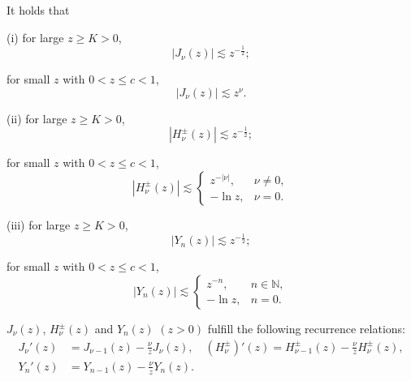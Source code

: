 \documentclass[10pt,a4paper]{amsart}
\newcommand{\N}{\mathbb N}
\newcommand{\f}{\frac}
\begin{document}
\begin{lemma}\label{lem1}
It holds that

(i) for large $z\geq K > 0$,
\begin{equation}\label{equ:q14}
|J_{\nu}(z)|\lesssim z^{-\f{1}{2}};
\end{equation}

\quad for small $z$ with $0<z\leq c<1$,
\begin{equation}\label{equ:q15}
|J_{\nu}(z)|\lesssim z^{\nu}.
\end{equation}

(ii) for large $z\geq K > 0$,
\begin{equation}\label{equ:q12}
|H_{\nu}^{\pm}(z)|\lesssim z^{-\f{1}{2}};
\end{equation}

\quad for small $z$ with $0<z\leq c<1$,
\begin{equation}\label{equ:q13}
\left|H_{\nu}^{ \pm}(z)\right| \lesssim \begin{cases}z^{-|\nu|}, & \nu \neq 0, \\
-\ln z, & \nu=0.
\end{cases}
\end{equation}

(iii) for large $z\geq K > 0$,
\begin{equation}\label{equ:q14-1}
|Y_{n}(z)|\lesssim z^{-\f{1}{2}};
\end{equation}

\quad for small $z$ with $0<z\leq c<1$,
\begin{equation}\label{equ:q15-1}
|Y_{n}(z)| \lesssim \begin{cases}z^{-n}, & n \in \N, \\
-\ln z, & n=0.
\end{cases}
\end{equation}
\end{lemma}

\begin{lemma}\label{lem1-1}
$J_{\nu}(z)$, $H_{\nu}^{\pm}(z)$ and $Y_{n}(z)$ $(z>0)$ fulfill the following recurrence relations:
\begin{equation}\label{equ:q15-11}
\begin{aligned}
J_{\nu}'(z)
&=J_{\nu-1}(z)-\f{\nu}{z}J_{\nu}(z),\quad
(H_{\nu}^{\pm})'(z)
=H_{\nu-1}^{\pm}(z)-\f{\nu}{z}H_{\nu}^{\pm}(z),\\
Y_{n}'(z)
&=Y_{n-1}(z)-\f{\nu}{z}Y_{n}(z).
\end{aligned}
\end{equation}

\end{lemma}
\end{document}
